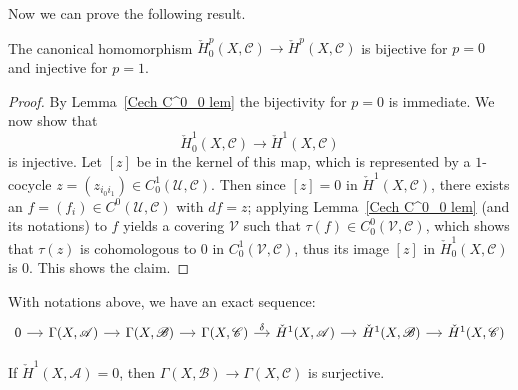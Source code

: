 Now we can prove the following result.
\begin{theorem}\label{Cech map p=0,1}
The canonical homomorphism $\check{H}^p_0(X,\mathscr{C})\to\check{H}^p(X,\mathscr{C})$ is bijective for $p=0$ and injective for $p=1$.
\end{theorem}
\begin{proof}
By Lemma~\ref{Cech C^0_0 lem} the bijectivity for $p=0$ is immediate. We now show that
\[\check{H}^1_0(X,\mathscr{C})\to\check{H}^1(X,\mathscr{C})\]
is injective. Let $[z]$ be in the kernel of this map, which is represented by a $1$-cocycle $z=(z_{i_0i_1})\in C^1_0(\mathcal{U},\mathscr{C})$. Then since $[z]=0$ in $\check{H}^1(X,\mathscr{C})$, there exists an $f=(f_i)\in C^0(\mathcal{U},\mathscr{C})$ with $df=z$; applying Lemma~\ref{Cech C^0_0 lem} (and its notations) to $f$ yields a covering $\mathcal{V}$ such that $\tau(f)\in C^0_0(\mathcal{V},\mathscr{C})$, which shows that $\tau(z)$ is cohomologous to $0$ in $C^1_0(\mathcal{V},\mathscr{C})$, thus its image $[z]$ in $\check{H}^1_0(X,\mathscr{C})$ is $0$. This shows the claim.
\end{proof}
\begin{corollary}\label{Cech long exact seq general}
With notations above, we have an exact sequence:
\[\begin{tikzcd}[column sep=small]
0\ar[r]&\Gamma(X,\mathscr{A})\ar[r]&\Gamma(X,\mathscr{B})\ar[r]&\Gamma(X,\mathscr{C})\ar[r,"\delta"]&\check{H}^1(X,\mathscr{A})\ar[r]&\check{H}^1(X,\mathscr{B})\ar[r]&\check{H}^1(X,\mathscr{C})
\end{tikzcd}\]
\end{corollary}
\begin{corollary}\label{Cech global section exact}
If $\check{H}^1(X,\mathscr{A})=0$, then $\Gamma(X,\mathscr{B})\to\Gamma(X,\mathscr{C})$ is surjective.
\end{corollary}
